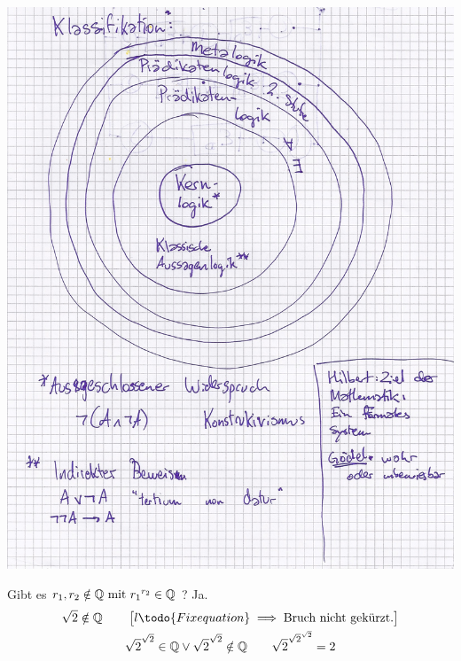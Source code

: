 \includegraphics[width=\textwidth]{Bild6} \\
\begin{bsp*}
	Gibt es $r_1 , r_2 \notin \mathbb{Q} \text{ mit } {r_1}^{r_2} \in \mathbb{Q}$ ? Ja.
	\begin{gather*}
		\sqrt{2} \notin \Q \qquad
		\begin{bmatrix*}{l} \todo{Fix equation}
			\implies \text{Bruch nicht gekürzt.}
		\end{bmatrix*} \\
		\sqrt{2}^{\sqrt{2}} \in \Q \vee \sqrt{2}^{\sqrt{2}} \notin \Q \qquad \sqrt{2}^{{\sqrt{2}}^{\sqrt{2}}} = 2
	\end{gather*}
\end{bsp*}
